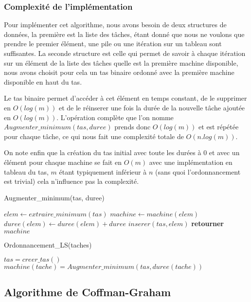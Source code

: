 \subsubsection{Complexité de l'implémentation}
Pour implémenter cet algorithme, nous avons besoin de deux structures de 
données, la première est la liste des tâches, étant donné que nous ne voulons 
que prendre le premier élément, une pile ou une itération sur un tableau sont 
suffisantes. La seconde structure est celle qui permet de savoir à chaque 
itération sur un élément de la liste des tâches quelle est la première machine 
disponible, nous avons choisit pour cela un tas binaire ordonné avec la première 
machine disponible en haut du tas.

Le tas binaire permet d'accéder à cet élément en temps constant, de le supprimer 
en $O(log(m))$ et de le réinserer une fois la durée de la nouvelle tâche ajoutée 
en $O(log(m))$.
L'opération complète que l'on nomme $Augmenter\_minimum(tas, duree)$ prends donc 
$O(log(m))$ et est répétée pour chaque tâche, ce qui nous fait une complexité 
totale de $O(n.log(m))$.

On note enfin que la création du tas initial avec toute les durées à 0 et avec 
un élément pour chaque machine se fait en $O(m)$ avec une implémentation en 
tableau du tas, $m$ étant typiquement inférieur à $n$ (sans quoi 
l'ordonnancement est trivial) cela n'influence pas la complexité.
\begin{algorithm}
\caption{Augmenter\_minimum(tas, duree)}
\begin{algorithmic}
\STATE $elem \leftarrow extraire\_minimum(tas)$
\STATE $machine \leftarrow machine(elem)$
\STATE $duree(elem) \leftarrow duree(elem) + duree$
\STATE $inserer(tas, elem)$
\STATE \textbf{retourner} $machine$
\end{algorithmic}
\end{algorithm}

\begin{algorithm}
\caption{Ordonnancement\_LS(taches)}
\begin{algorithmic}
\STATE $tas = creer\_tas()$
\STATE $machine(tache) = Augmenter\_minimum(tas, duree(tache))$
\ENDFOR
\end{algorithmic}
\end{algorithm}
\subsection{Algorithme de Coffman-Graham}

